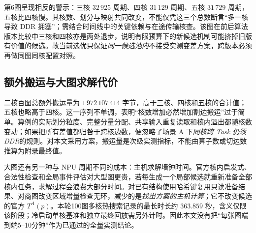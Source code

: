 第6图呈现相反的警示：三核 $32\,925$ 周期、四核 $31\,129$ 周期、五核 $31\,729$ 周期，五核比四核慢。其核数、划分与映射共同改变，不能仅凭这三个总数断言“多一核导致 DDR 拥塞”；需结合时间线中的关键依赖与在途传输核查。该图在前后算法版本比较中三核和四核亦是两处退步，说明有限预算下的新候选机制可能挤掉旧版有价值的候选。故当前选优只保证\emph{同一候选池内}不接受实测变差方案，跨版本必须再做同图同核配置对照。

\subsection{额外搬运与大图求解代价}
二核百图总额外搬运量为 $1\,972\,107\,414$ 字节，高于三核、四核和五核的合计值；五核也略高于四核。这一序列不单调，表明“核数增加必然增加割边搬运”过于简单。算例的实际划分粒度、完整分量分配、共享输入重复读取和核内溢出都随核数变动；如果把所有差值都归咎于跨核边数，便忽略了场景 A 下\emph{同核跨 Task 仍须 DDR}的规则。对本文采用方案，搬运量是次级实测指标，不能由算子数或切边数推算为附录最终值。

大图还有另一种与 NPU 周期不同的成本：主机求解墙钟时间。官方核内启发式、合法性检查和全局事件评估对大型图更贵，若每生成一个局部候选就重新准备全部核内任务，求解过程会浪费大部分时间。对已有结构使用哈希键复用只读准备结果、对商图改变区域增量检查无环，减少的是\emph{找出方案的主机计算}；它不改变候选的官方 $T^A(p)$。本轮100图多核热搜索记录的最长时长约 $363.859$ 秒，含义仅限该阶段；冷启动单核基准和独立最终回放需另外计时。因此本文没有把“每张图端到端5--10分钟”作为已通过的全量实测结论。
